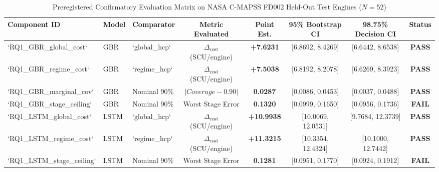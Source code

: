 \documentclass[conference,a4paper]{IEEEtran}
\newcommand{\Deltacost}{\Delta_{\text{cost}}}
\begin{document}
\begin{table}[t]
\caption{Preregistered Confirmatory Evaluation Matrix on NASA C-MAPSS FD002 Held-Out Test Engines ($N=52$)}
\label{tab:confirmatory_results}
\centering
\begin{tabular}{lllccccc}
\toprule
\textbf{Component ID} & \textbf{Model} & \textbf{Comparator} & \textbf{Metric Evaluated} & \textbf{Point Est.} & \textbf{95\% Bootstrap CI} & \textbf{98.75\% Decision CI} & \textbf{Status} \\
\midrule
`RQ1_GBR_global_cost` & GBR & `global_hcp` & $\Deltacost$ (SCU/engine) & \textbf{+7.6231} & [6.8692, 8.4269] & [6.6442, 8.6538] & \textbf{PASS} \\
`RQ1_GBR_regime_cost` & GBR & `regime_hcp` & $\Deltacost$ (SCU/engine) & \textbf{+7.5038} & [6.8192, 8.2078] & [6.6269, 8.3923] & \textbf{PASS} \\
`RQ1_GBR_marginal_cov` & GBR & Nominal 90\% & $|Coverage - 0.90|$ & \textbf{0.0287} & [0.0086, 0.0453] & [0.0037, 0.0488] & \textbf{PASS} \\
`RQ1_GBR_stage_ceiling` & GBR & Nominal 90\% & Worst Stage Error & \textbf{0.1320} & [0.0999, 0.1650] & [0.0956, 0.1736] & \textbf{FAIL} \\
`RQ1_LSTM_global_cost` & LSTM & `global_hcp` & $\Deltacost$ (SCU/engine) & \textbf{+10.9938} & [10.0069, 12.0531] & [9.7684, 12.3739] & \textbf{PASS} \\
`RQ1_LSTM_regime_cost` & LSTM & `regime_hcp` & $\Deltacost$ (SCU/engine) & \textbf{+11.3215} & [10.3354, 12.4324] & [10.1000, 12.7442] & \textbf{PASS} \\
`RQ1_LSTM_stage_ceiling` & LSTM & Nominal 90\% & Worst Stage Error & \textbf{0.1281} & [0.0951, 0.1770] & [0.0924, 0.1912] & \textbf{FAIL} \\
\bottomrule
\end{tabular}
\end{table}
\end{document}
